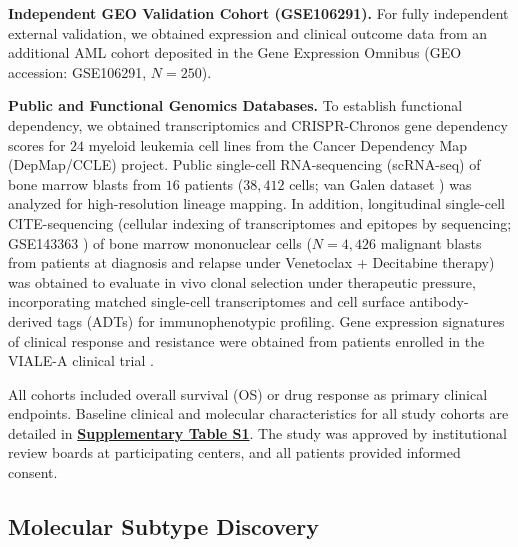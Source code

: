\documentclass[11pt,a4paper]{article}
\begin{document}
\textbf{Independent GEO Validation Cohort (GSE106291).} For fully independent external validation, we obtained expression and clinical outcome data from an additional AML cohort deposited in the Gene Expression Omnibus (GEO accession: GSE106291, $N=250$).

\textbf{Public and Functional Genomics Databases.} To establish functional dependency, we obtained transcriptomics and CRISPR-Chronos gene dependency scores for $24$ myeloid leukemia cell lines from the Cancer Dependency Map (DepMap/CCLE) project. Public single-cell RNA-sequencing (scRNA-seq) of bone marrow blasts from $16$ patients ($38{,}412$ cells; van Galen dataset \cite{vangalen2019single}) was analyzed for high-resolution lineage mapping. In addition, longitudinal single-cell CITE-sequencing (cellular indexing of transcriptomes and epitopes by sequencing; GSE143363 \cite{pei2020monocytic}) of bone marrow mononuclear cells ($N=4{,}426$ malignant blasts from patients at diagnosis and relapse under Venetoclax + Decitabine therapy) was obtained to evaluate in vivo clonal selection under therapeutic pressure, incorporating matched single-cell transcriptomes and cell surface antibody-derived tags (ADTs) for immunophenotypic profiling. Gene expression signatures of clinical response and resistance were obtained from patients enrolled in the VIALE-A clinical trial \cite{dinardo2020nejm}.

All cohorts included overall survival (OS) or drug response as primary clinical endpoints. Baseline clinical and molecular characteristics for all study cohorts are detailed in \href{Supplementary_Methods.pdf#tab:tabS1}{\textbf{Supplementary Table S1}}. The study was approved by institutional review boards at participating centers, and all patients provided informed consent.

\subsection{Molecular Subtype Discovery}
\end{document}
